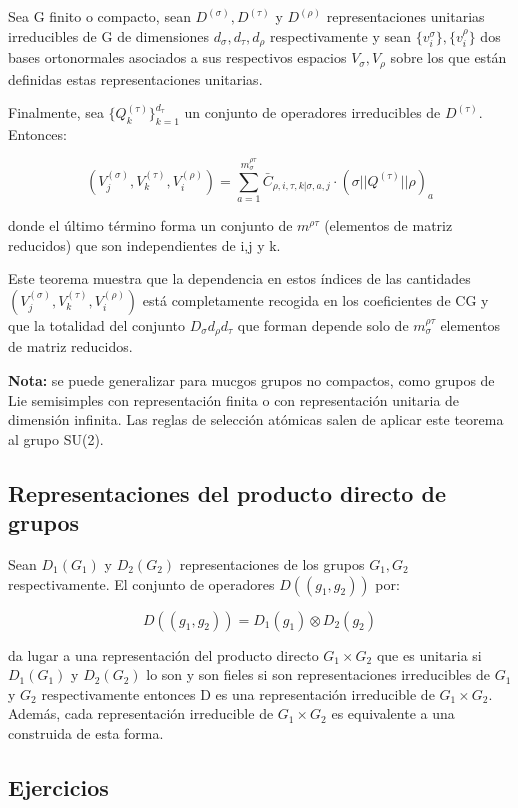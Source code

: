 \smallskip
Sea G finito o compacto, sean $D^{(\sigma)}, D^{(\tau)}$ y $D^{(\rho)}$ representaciones unitarias irreducibles de G de dimensiones $d_\sigma,d_\tau, d_\rho$ respectivamente y sean $\lbrace v_i^{\sigma}\rbrace, \lbrace v_i^{\rho}\rbrace $ dos bases ortonormales asociados a sus respectivos espacios $V_\sigma, V_\rho$ sobre los que están definidas estas representaciones unitarias.

Finalmente, sea $\lbrace Q_k^{(\tau)} \rbrace _{k=1}^{d_\tau}$ un conjunto de operadores irreducibles de $D^{(\tau)}$. Entonces:

$$(V_j^{(\sigma)}, V_k^{(\tau)}, V_i^{(\rho)})=\sum _{a=1}^{m_\sigma ^{\rho \tau}} \bar{C}_{\rho, i, \tau ,k | \sigma , a, j}\cdot (\sigma || Q^{(\tau)}||\rho)_a$$

donde el último término forma un conjunto de $m^{\rho \tau}$ (elementos de matriz reducidos) que son independientes de i,j y k.

Este teorema muestra que la dependencia en estos índices de las cantidades $(V_j^{(\sigma)}, V_k^{(\tau)}, V_i^{(\rho)})$ está completamente recogida en los coeficientes de CG y que la totalidad del conjunto $D_\sigma d_\rho d_\tau$ que forman depende solo de $m^{\rho \tau}_\sigma$ elementos de matriz reducidos.

\smallskip
\textbf{Nota:} se puede generalizar para mucgos grupos no compactos, como grupos de Lie semisimples con representación finita o con representación unitaria de dimensión infinita.
Las reglas de selección atómicas salen de aplicar este teorema al grupo SU(2).

\subsection{Representaciones del producto directo de grupos}

Sean $D_1(G_1)$ y $D_2 (G_2)$ representaciones de los grupos $G_1, G_2$ respectivamente. El conjunto de operadores $D((g_1,g_2))$ por:

$$D((g_1,g_2))=D_1(g_1)\otimes D_2(g_2)$$

da lugar a una representación del producto directo $G_1\times G_2$ que es unitaria si $D_1(G_1)$ y $D_2(G_2)$ lo son y son fieles si son representaciones irreducibles de $G_1$ y $G_2$ respectivamente entonces D es una representación irreducible de $G_1 \times G_2$. Además, cada representación irreducible de $G_1 \times G_2$ es equivalente a una construida de esta forma.

\newpage
\subsection{Ejercicios}

